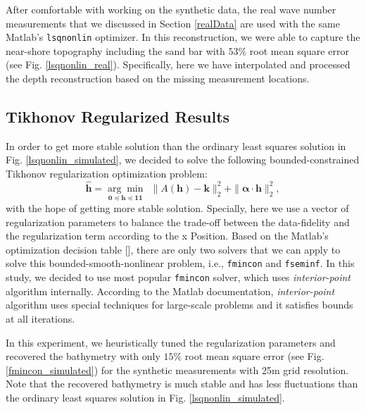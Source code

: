 After comfortable with working on the synthetic data, the real wave number measurements that we discussed in Section \ref{realData} are used with the same Matlab's \verb|lsqnonlin| optimizer. In this reconstruction, we were able to capture the near-shore topography including the sand bar with $53\%$ root mean square error (see Fig. \ref{lsqnonlin_real}). Specifically, here we have interpolated and processed the depth reconstruction based on the missing measurement locations. 


\subsection{Tikhonov Regularized Results} \label{TickReg}

In order to get more stable solution than the ordinary least squares solution in Fig. \ref{lsqnonlin_simulated}, we decided to solve the following bounded-constrained Tikhonov regularization optimization problem:
\begin{equation}\label{LS-regBC}
\mathbf{\hat{h}} = \underset{\mathbf{0} \preceq \mathbf{h} \preceq \mathbf{11}}{\arg \min} \ \ \|  A(\mathbf{h}) -  \mathbf{k} \|_2^2  +   \| \boldsymbol{\alpha} \cdot  \mathbf{h}\|_2^2,
\end{equation}
with the hope of getting more stable solution. Specially, here we use a vector of regularization parameters to balance the trade-off between the data-fidelity and the regularization term according to the x Position. Based on the Matlab's optimization decision table [], there are only two solvers that we can apply to solve this bounded-smooth-nonlinear problem, i.e., \verb|fmincon| and \verb|fseminf|. In this study, we decided to use  most popular \verb|fmincon| solver, which uses \textit{interior-point} algorithm internally. According to the Matlab documentation, \textit{interior-point} algorithm uses special techniques for large-scale problems and it satisfies bounds at all iterations. 

In this experiment, we heuristically tuned the regularization parameters and recovered the bathymetry with only $15\%$ root mean square error (see Fig. \ref{fmincon_simulated}) for the synthetic measurements with 25m grid resolution. Note that the recovered bathymetry is much stable and has less fluctuations than the ordinary least squares solution in Fig. \ref{lsqnonlin_simulated}.   
 
